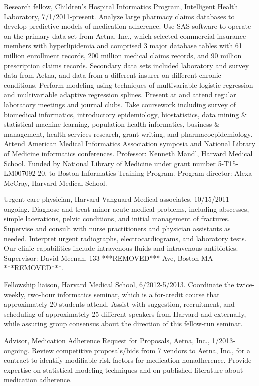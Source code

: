 \documentclass[12pt]{article}
\begin{document}
Research fellow, Children’s Hospital Informatics Program, Intelligent
Health Laboratory, 7/1/2011-present. Analyze large pharmacy claims
databases to develop predictive models of medication adherence. Use
SAS software to operate on the primary data set from Aetna, Inc.,
which selected commercial insurance members with hyperlipidemia and
comprised 3 major database tables with 61 million enrollment records,
200 million medical claims records, and 90 million prescription claims
records. Secondary data sets included laboratory and survey data from
Aetna, and data from a different insurer on different chronic
conditions. Perform modeling using techniques of multivariable
logistic regression and multivariable adaptive regression splines.
Present at and attend regular laboratory meetings and journal clubs.
Take coursework including survey of biomedical informatics,
introductory epidemiology, biostatistics, data mining \& statistical
machine learning, population health informatics, business \&
management, health services research, grant writing, and
pharmacoepidemiology. Attend American Medical Informatics Association
symposia and National Library of Medicine informatics conferences.
Professor: Kenneth Mandl, Harvard Medical School. Funded by National
Library of Medicine under grant number 5-T15-LM007092-20, to Boston
Informatics Training Program. Program director: Alexa McCray, Harvard
Medical School.

Urgent care physician, Harvard Vanguard Medical associates,
10/15/2011-ongoing. Diagnose and treat minor acute medical problems,
including abscesses, simple lacerations, pelvic conditions, and
initial management of fractures. Supervise and consult with nurse
practitioners and physician assistants as needed. Interpret urgent
radiographs, electrocardiograms, and laboratory tests. Our clinic
capabilities include intravenous fluids and intravenous antibiotics.
Supervisor: David Meenan, 133 ***REMOVED*** Ave, Boston MA ***REMOVED***.

Fellowship liaison, Harvard Medical School, 6/2012-5/2013. Coordinate
the twice-weekly, two-hour informatics seminar, which is a for-credit
course that approximately 20 students attend. Assist with suggestion,
recruitment, and scheduling of approximately 25 different speakers
from Harvard and externally, while assuring group consensus about the
direction of this fellow-run seminar.

Advisor, Medication Adherence Request for Proposals, Aetna, Inc.,
1/2013-ongoing. Review competitive proposals/bids from 7 vendors to
Aetna, Inc., for a contract to identify modifiable risk factors for
medication nonadherence. Provide expertise on statistical modeling
techniques and on published literature about medication adherence.
\end{document}
